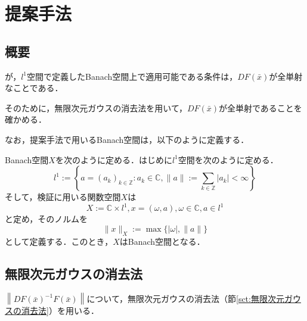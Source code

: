 
\chapter{提案手法}
\label{cpt:提案手法}

\section{概要}

\rad{}が，$l^1$空間で定義したBanach空間上で適用可能である条件は，$DF(\bar{x})$が全単射なことである．

そのために，無限次元ガウスの消去法を用いて，$DF(\bar{x})$が全単射であることを確かめる．

なお，提案手法で用いるBanach空間は，以下のように定義する．

\begin{dfn}[許容重みなしBanach空間$X$]
  \label{dfn:Banach-l1}
  Banach空間$X$を次のように定める．はじめに$l^1$空間を次のように定める．
  \begin{equation}
    l^1 := \left\{ a=(a_k)_{k\in \mathbb{Z}} : a_k \in \mathbb{C}, \|a\| := \sum_{k \in \mathbb{Z}} |a_k| < \infty \right\}
  \end{equation}
  そして，検証に用いる関数空間$X$は
  \begin{equation}
    X:= \mathbb{C} \times l^1, x = (\omega, a), \omega \in \mathbb{C}, a \in l^1
  \end{equation}
  と定め，そのノルムを
  \begin{equation}
    \| x \|_X := \max \{ |\omega| , \|a\| \}
  \end{equation}
  として定義する．このとき，$X$はBanach空間となる．
\end{dfn}

\section{無限次元ガウスの消去法}
$\left \| DF(\bar{x})^{-1} F(\bar{x}) \right \|$について，無限次元ガウスの消去法（節\ref{sct:無限次元ガウスの消去法}）を用いる．

